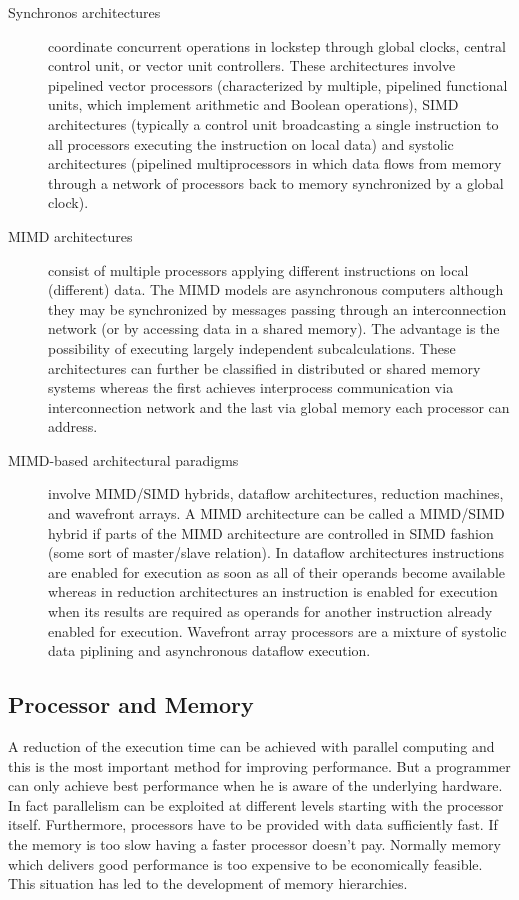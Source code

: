 \begin{description}
\item[Synchronos architectures] coordinate concurrent operations in
  lockstep through global clocks, central control unit, or vector unit
  controllers. These architectures involve pipelined vector processors
  (characterized by multiple, pipelined functional units, which
  implement arithmetic and Boolean operations), SIMD architectures
  (typically a control unit broadcasting a single instruction to
  all processors executing the instruction on local data) and systolic
  architectures (pipelined multiprocessors in which data flows from
  memory through a network of processors back to memory synchronized
  by a global clock). 
\item[MIMD architectures] consist of multiple processors applying
  different instructions on local (different) data. The MIMD models
  are asynchronous computers although they may be synchronized by
  messages passing through an interconnection network (or by accessing
  data in a shared memory). The advantage is the possibility of
  executing largely independent subcalculations. These architectures
  can further be classified in distributed or shared memory systems
  whereas the first achieves interprocess communication via 
  interconnection network and the last via global memory each
  processor can address.
\item[MIMD-based architectural paradigms] involve MIMD/SIMD hybrids,
  dataflow architectures, reduction machines, and wavefront arrays. A
  MIMD architecture can be called a MIMD/SIMD hybrid if parts of the
  MIMD architecture are controlled in SIMD fashion (some sort of
  master/slave relation). In dataflow architectures instructions are
  enabled for execution as soon as all of their operands become
  available whereas in reduction architectures an instruction is
  enabled for execution when its results are required as operands for
  another instruction already enabled for execution. Wavefront array
  processors are a mixture of systolic data piplining and asynchronous
  dataflow execution.
\end{description}

\subsection{Processor and Memory}
\label{sec:processorandmemory}
A reduction of the execution time can be achieved with parallel
computing and this is the most important method for improving
performance. But a programmer can only achieve best performance when
he is aware of the underlying hardware. In fact parallelism can be
exploited at different levels starting with the processor
itself. Furthermore, processors have to be provided with data
sufficiently fast. If the memory is too slow having a faster processor
doesn't pay. Normally memory which delivers good performance is too
expensive to be economically feasible. This situation has led to the
development of memory hierarchies.

